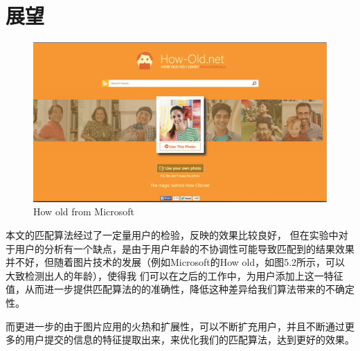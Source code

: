 \section{展望}
\begin{figure}[h]
\begin{minipage}[t]{\linewidth}
\centering
\includegraphics[width=\textwidth]{img/chap5/how_old.png}
\caption{How old from Microsoft\label{Face++API}}
\end{minipage}
\end{figure}
本文的匹配算法经过了一定量用户的检验，反映的效果比较良好，
但在实验中对于用户的分析有一个缺点，是由于用户年龄的不协调性可能导致匹配到的结果效果并不好，但随着图片技术的发展（例如Microsoft的How old，如图5.2所示，可以大致检测出人的年龄），使得我	们可以在之后的工作中，为用户添加上这一特征值，从而进一步提供匹配算法的的准确性，降低这种差异给我们算法带来的不确定性。

而更进一步的由于图片应用的火热和扩展性，可以不断扩充用户，并且不断通过更多的用户提交的信息的特征提取出来，来优化我们的匹配算法，达到更好的效果。





